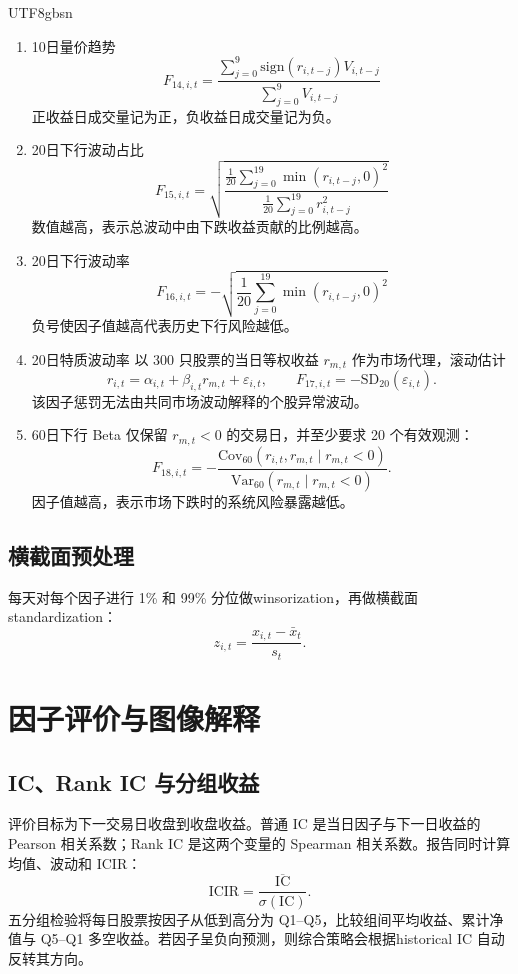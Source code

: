 \documentclass[a4paper,11pt,openany]{report}
\begin{document}
\begin{CJK*}{UTF8}{gbsn}
\begin{enumerate}[label=\roman*)]
    \item 10日量价趋势
    $$F_{14,i,t}=\frac{\sum_{j=0}^{9}\mathrm{sign}(r_{i,t-j})V_{i,t-j}}{\sum_{j=0}^{9}V_{i,t-j}}$$
    正收益日成交量记为正，负收益日成交量记为负。

    \item 20日下行波动占比
    $$F_{15,i,t}=\sqrt{\frac{\frac{1}{20}\sum_{j=0}^{19}\min(r_{i,t-j},0)^{2}}{\frac{1}{20}\sum_{j=0}^{19}r^{2}_{i,t-j}}}$$
    数值越高，表示总波动中由下跌收益贡献的比例越高。

    \item 20日下行波动率
    $$F_{16,i,t}=-\sqrt{\frac{1}{20}\sum_{j=0}^{19}\min(r_{i,t-j},0)^2}$$
    负号使因子值越高代表历史下行风险越低。

    \item 20日特质波动率
    以 300 只股票的当日等权收益 $r_{m,t}$ 作为市场代理，滚动估计
    $$r_{i,t}=\alpha_{i,t}+\beta_{i,t}r_{m,t}+\varepsilon_{i,t},\qquad
    F_{17,i,t}=-\mathrm{SD}_{20}(\varepsilon_{i,t}).$$
    该因子惩罚无法由共同市场波动解释的个股异常波动。

    \item 60日下行 Beta
    仅保留 $r_{m,t}<0$ 的交易日，并至少要求 20 个有效观测：
    $$F_{18,i,t}=-\frac{\mathrm{Cov}_{60}(r_{i,t},r_{m,t}\mid r_{m,t}<0)}
    {\mathrm{Var}_{60}(r_{m,t}\mid r_{m,t}<0)}.$$
    因子值越高，表示市场下跌时的系统风险暴露越低。

\end{enumerate}



\section{横截面预处理}

每天对每个因子进行 1\% 和 99\% 分位做winsorization，再做横截面standardization：
\begin{equation}
z_{i,t}=\frac{x_{i,t}-\bar x_t}{s_t}.
\end{equation}


\chapter{因子评价与图像解释}

\section{IC、Rank IC 与分组收益}

评价目标为下一交易日收盘到收盘收益。普通 IC 是当日因子与下一日收益的 Pearson 相关系数；Rank IC 是这两个变量的 Spearman 相关系数。报告同时计算均值、波动和 ICIR：
\begin{equation}
\mathrm{ICIR}=\frac{\overline{\mathrm{IC}}}{\sigma(\mathrm{IC})}.
\end{equation}
五分组检验将每日股票按因子从低到高分为 Q1--Q5，比较组间平均收益、累计净值与 Q5--Q1 多空收益。若因子呈负向预测，则综合策略会根据historical IC 自动反转其方向。


\end{CJK*}
\end{document}
